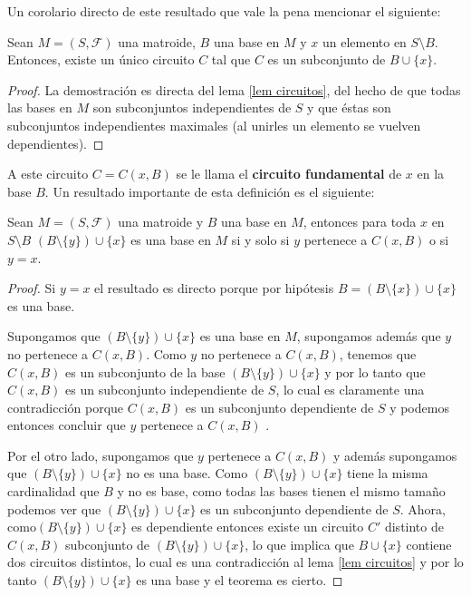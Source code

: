 Un corolario directo de este resultado que vale la pena mencionar el siguiente:

\begin{cor} \label{circuitos bases}
Sean $M=(S,\mathcal{F})$ una matroide, $B$ una base en $M$ y $x$ un elemento en $S \setminus B$. Entonces, existe un único circuito $C$ tal que $C$ es un subconjunto de $B \cup \{x\}$. 
\end{cor}

\begin{proof}
La demostración es directa del lema \ref{lem circuitos}, del hecho de que todas las bases en $M$ son subconjuntos independientes de $S$ y que éstas son subconjuntos independientes maximales (al unirles un elemento se vuelven dependientes). 
\end{proof}

A este circuito $C=C(x,B)$ se le llama el \textbf{circuito fundamental} de $x$ en la base $B$. Un resultado importante de esta definición es el siguiente:

\begin{teo}
Sean $M=(S,\mathcal{F})$ una matroide y $B$ una base en $M$, entonces para toda $x$ en $S \setminus B$ $(B \setminus \{ y\}) \cup \{x\}$ es una base en $M$ si y solo si $y$ pertenece a $C(x,B)$ o si $y=x$.
\end{teo}

\begin{proof}
Si $y=x$ el resultado es directo porque por hipótesis $B=$$(B \setminus \{ x\}) \cup \{x\}$ es una base. 
 
Supongamos que $(B \setminus \{ y\}) \cup \{x\}$ es una base en $M$, supongamos además que $y$ no pertenece a $C(x,B)$. Como $y$ no pertenece a $C(x,B)$, tenemos que $C(x,B)$ es un subconjunto de la base $(B \setminus \{ y\}) \cup \{x\}$ y por lo tanto que $C(x,B)$ es un subconjunto independiente de $S$, lo cual es claramente una contradicción porque $C(x,B)$ es un subconjunto dependiente de $S$ y podemos entonces concluir que $y$ pertenece a $C(x,B)$ . 

Por el otro lado, supongamos que $y$ pertenece a $C(x,B)$ y además supongamos que $(B \setminus \{ y\}) \cup \{x\}$ no es una base. Como $(B \setminus \{ y\}) \cup \{x\}$ tiene la misma cardinalidad que $B$ y no es base, como todas las bases tienen el mismo tamaño podemos ver que $(B \setminus \{ y\}) \cup \{x\}$ es un subconjunto dependiente de $S$. Ahora, como$(B \setminus \{ y\}) \cup \{x\}$ es dependiente entonces existe un circuito $C'$ distinto de $C(x,B)$ subconjunto de $(B \setminus \{ y\}) \cup \{x\}$, lo que implica que $B \cup \{x\}$ contiene dos circuitos distintos, lo cual es una contradicción al lema \ref{lem circuitos} y por lo tanto $(B \setminus \{ y\}) \cup \{x\}$ es una base y el teorema es cierto. 
\end{proof}

